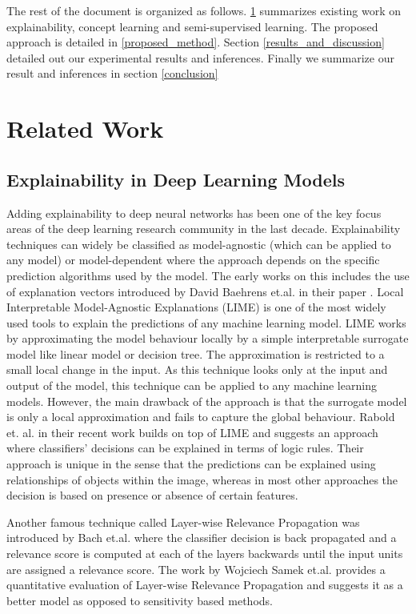 \documentclass{JMLFS}
\begin{document}
The rest of the document is organized as follows. \ref{related_work} summarizes existing work on explainability, concept learning and semi-supervised learning.
The proposed approach is detailed in \ref{proposed_method}. Section \ref{results_and_discussion} detailed out our experimental results and inferences.
Finally we summarize our result and inferences in section \ref{conclusion}


\section{Related Work}\label{related_work}

\subsection{Explainability in Deep Learning Models}\label{lit_survey_explainability}
Adding explainability to deep neural networks has been one of the key focus areas of the deep learning research community in the last decade.
Explainability techniques can widely be classified as model-agnostic (which can be applied to any model) or model-dependent where the approach depends on the specific prediction algorithms used by the model.
The early works on this includes the use of explanation vectors introduced by David Baehrens et.al. in their paper \cite{baehrens2010explain}.
Local Interpretable Model-Agnostic Explanations (LIME) \cite{ribeiro2016should} is one of the most widely used tools to explain the predictions of any machine learning model.
LIME works by approximating the model behaviour locally by a simple interpretable surrogate model like linear model or decision tree. The approximation is restricted to a small local change in the input. As this technique looks only at the input and output of the model, this technique can be applied to any machine learning models.
However, the main drawback of the approach is that the surrogate model is only a local approximation and fails to capture the global behaviour.
Rabold et. al. in their recent work \cite{rabold2019enriching} builds on top of LIME and suggests an approach where classifiers' decisions can be explained in terms of logic rules. Their approach is unique in the sense that the predictions can be explained using relationships of objects within the image, whereas in most other approaches the decision is based on presence or absence of certain features.

Another famous technique called Layer-wise Relevance Propagation was introduced by Bach et.al. \cite{bach2015pixel} where the classifier decision is  back propagated and a relevance score is computed at each of the layers backwards until the input units are assigned a relevance score.
The work by Wojciech Samek et.al. \cite{samek2016evaluating} provides a quantitative  evaluation of Layer-wise Relevance Propagation and  suggests it as a better model as opposed to sensitivity based methods.
\end{document}
